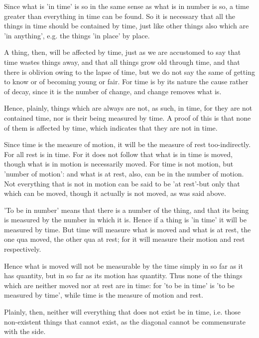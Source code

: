 Since what is 'in time' is so in the same sense as what is in number
is so, a time greater than everything in time can be found. So it
is necessary that all the things in time should be contained by time,
just like other things also which are 'in anything', e.g. the things
'in place' by place. 

A thing, then, will be affected by time, just as we are accustomed
to say that time wastes things away, and that all things grow old
through time, and that there is oblivion owing to the lapse of time,
but we do not say the same of getting to know or of becoming young
or fair. For time is by its nature the cause rather of decay, since
it is the number of change, and change removes what is. 

Hence, plainly, things which are always are not, as such, in time,
for they are not contained time, nor is their being measured by time.
A proof of this is that none of them is affected by time, which indicates
that they are not in time. 

Since time is the measure of motion, it will be the measure of rest
too-indirectly. For all rest is in time. For it does not follow that
what is in time is moved, though what is in motion is necessarily
moved. For time is not motion, but 'number of motion': and what is
at rest, also, can be in the number of motion. Not everything that
is not in motion can be said to be 'at rest'-but only that which can
be moved, though it actually is not moved, as was said above.

'To be in number' means that there is a number of the thing, and that
its being is measured by the number in which it is. Hence if a thing
is 'in time' it will be measured by time. But time will measure what
is moved and what is at rest, the one qua moved, the other qua at
rest; for it will measure their motion and rest respectively.

Hence what is moved will not be measurable by the time simply in so
far as it has quantity, but in so far as its motion has quantity.
Thus none of the things which are neither moved nor at rest are in
time: for 'to be in time' is 'to be measured by time', while time
is the measure of motion and rest. 

Plainly, then, neither will everything that does not exist be in time,
i.e. those non-existent things that cannot exist, as the diagonal
cannot be commensurate with the side. 

